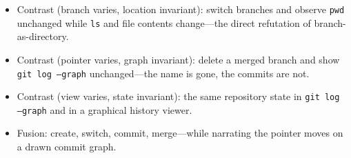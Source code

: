 \begin{itemize}
  \item Contrast (branch varies, location invariant): switch branches and
    observe \texttt{pwd} unchanged while \texttt{ls} and file contents
    change---the direct refutation of branch-as-directory.
  \item Contrast (pointer varies, graph invariant): delete a merged
    branch and show \texttt{git log --graph} unchanged---the name is gone,
    the commits are not.
  \item Contrast (view varies, state invariant): the same repository state
    in \texttt{git log --graph} and in a graphical history viewer.
  \item Fusion: create, switch, commit, merge---while narrating the
    pointer moves on a drawn commit graph.
\end{itemize}

